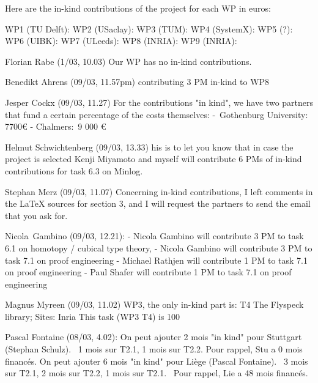 \begin{todo}{}\color{blue}

Here are the in-kind contributions of the project for each WP in euros:

WP1 (TU Delft):
WP2 (USaclay):
WP3 (TUM):
WP4 (SystemX):
WP5 (?):
WP6 (UIBK):
WP7 (ULeeds):
WP8 (INRIA):
WP9 (INRIA):

Florian Rabe (1/03, 10.03)
Our WP has no in-kind contributions.

Benedikt Ahrens (09/03, 11.57pm)
contributing 3 PM in-kind to WP8

Jesper Cockx (09/03, 11.27)
For the contributions "in kind", we have two partners that fund a certain percentage of the costs themselves:
- Gothenburg University: 7700€
- Chalmers: 9 000 €

Helmut Schwichtenberg (09/03, 13.33)
his is to let you know that in case the project is selected Kenji
Miyamoto and myself will contribute 6 PMs of in-kind contributions for
task 6.3 on Minlog.

Stephan Merz (09/03, 11.07)
Concerning in-kind contributions, I left comments in the LaTeX sources for section 3, and I will request the partners to send the email that you ask for.

Nicola Gambino (09/03, 12.21):
- Nicola Gambino will contribute 3 PM to task 6.1 on homotopy / cubical type theory,
- Nicola Gambino will contribute 3 PM to task 7.1 on proof engineering
- Michael Rathjen will contribute 1 PM to task 7.1 on proof engineering
- Paul Shafer will contribute 1 PM to task 7.1 on proof engineering

Magnus Myreen (09/03, 11.02)
WP3, the only in-kind part is: T4 The Flyspeck library; Sites: Inria
This task (WP3 T4) is 100 %

Pascal Fontaine (08/03, 4.02):
On peut ajouter 2 mois "in kind" pour Stuttgart (Stephan Schulz).  1 mois sur T2.1, 1 mois sur T2.2. Pour rappel, Stu a 0 mois financés.
On peut ajouter 6 mois "in kind" pour Liège (Pascal Fontaine).  3 mois sur T2.1, 2 mois sur T2.2, 1 mois sur T2.1.  Pour rappel, Lie a 48 mois financés.
\end{todo}




